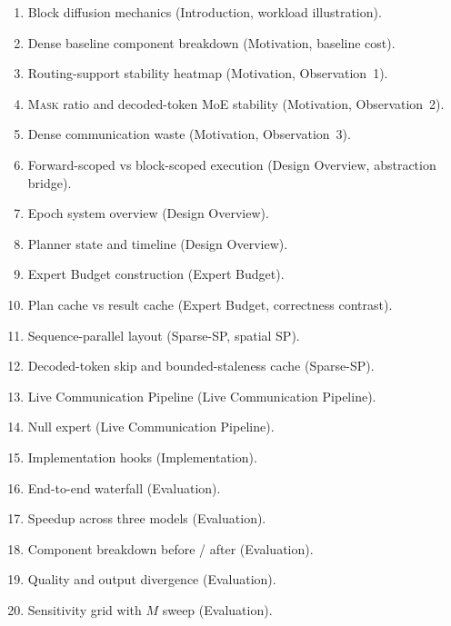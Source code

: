 \documentclass[sigconf,review,anonymous, 10pt]{acmart}
\newcommand{\sys}{Epoch}
\newcommand{\mask}{\textsc{Mask}}
\begin{document}
\begin{enumerate}[leftmargin=1.4em]
\item Block diffusion mechanics (Introduction, workload illustration).
\item Dense baseline component breakdown (Motivation, baseline cost).
\item Routing-support stability heatmap (Motivation, Observation~1).
\item \mask{} ratio and decoded-token MoE stability (Motivation, Observation~2).
\item Dense communication waste (Motivation, Observation~3).
\item Forward-scoped vs block-scoped execution (Design Overview, abstraction bridge).
\item \sys{} system overview (Design Overview).
\item Planner state and timeline (Design Overview).
\item Expert Budget construction (Expert Budget).
\item Plan cache vs result cache (Expert Budget, correctness contrast).
\item Sequence-parallel layout (Sparse-SP, spatial SP).
\item Decoded-token skip and bounded-staleness cache (Sparse-SP).
\item Live Communication Pipeline (Live Communication Pipeline).
\item Null expert (Live Communication Pipeline).
\item Implementation hooks (Implementation).
\item End-to-end waterfall (Evaluation).
\item Speedup across three models (Evaluation).
\item Component breakdown before / after (Evaluation).
\item Quality and output divergence (Evaluation).
\item Sensitivity grid with $M$ sweep (Evaluation).
\end{enumerate}
\end{document}
